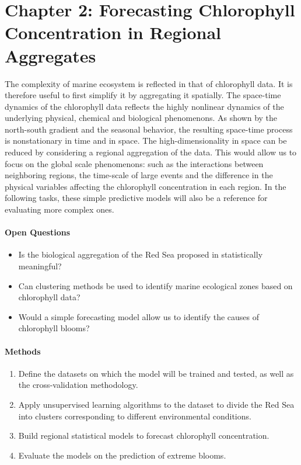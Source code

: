 \section{Chapter 2: Forecasting Chlorophyll Concentration in Regional
Aggregates}

The complexity of marine ecosystem is reflected in that of chlorophyll data. 
It is therefore useful to first simplify it
by aggregating it spatially. The space-time dynamics of the chlorophyll data
reflects the highly nonlinear dynamics of the underlying physical, chemical and
biological phenomenons. As shown by the north-south gradient and the seasonal
behavior, the resulting space-time process is nonstationary in time and in
space. The high-dimensionality in space can be reduced by considering a
regional aggregation of the data. This would allow us to focus on the global
scale phenomenons: such as the interactions between neighboring regions, the
time-scale of large events and the difference in the physical variables
affecting the chlorophyll concentration in each region. In the following tasks,
these simple predictive models will also be a reference for evaluating more
complex ones. 

\paragraph{Open Questions}

\begin{itemize}

\item Is the biological aggregation of the Red Sea proposed in
\cite{Raitsos2013} statistically meaningful?

\item Can clustering methods be used to identify marine ecological zones based
on chlorophyll data?

\item Would a simple forecasting model allow us to identify the causes of
chlorophyll blooms?

\end{itemize}

\paragraph{Methods}

\begin{enumerate}

\item Define the datasets on which the model will be trained and tested,
as well as the cross-validation methodology.

\item Apply unsupervised learning algorithms to the dataset to divide
the Red Sea into clusters corresponding to different environmental
conditions.

\item Build regional statistical models to forecast chlorophyll concentration.

\item Evaluate the models on the prediction of extreme blooms.

\end{enumerate}

